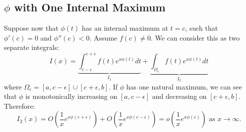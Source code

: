 \documentclass[../Main.tex]{subfiles}
\begin{document}
\subsection{\texorpdfstring{$\phi$}{phi} with One Internal Maximum} \label{sscPhiMaxCase}
Suppose now that $\phi(t)$ has an internal maximum at $t = c$, such that $\phi'(c) = 0$ and $\phi''(c) < 0$. Assume $f(c) \neq 0$. We can consider this as two separate integrals:
\begin{equation*}
    I(x) = \underbrace{\int_{c - \epsilon}^{c + \epsilon} f(t)e^{x\phi(t)} dt}_{I_1} + \underbrace{\int_{\Omega_{\epsilon}} f(t) e^{x\phi(t)} dt}_{I_2}
\end{equation*}
where $\Omega_\epsilon = [a, c - \epsilon] \cup [c + \epsilon, b]$. If $\phi$ has one natural maximum, we can see that $\phi$ is monotonically increasing on $[a, c - \epsilon]$ and decreasing on $[c + \epsilon, b]$. Therefore:
\begin{equation*}
    I_2(x) = O\left(\frac1x e^{x\phi(c + \epsilon)}\right) + O\left(\frac1x e^{x\phi(c - \epsilon)}\right) = o\left(\frac1x e^{x\phi(c)}\right) \text{ as $x \to \infty$}.
\end{equation*}
\end{document}
